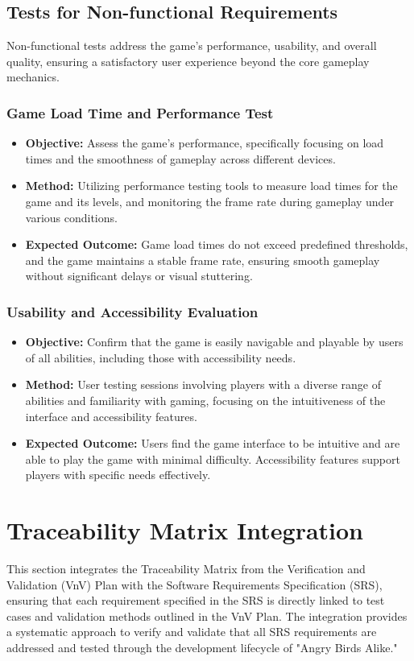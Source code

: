 \documentclass[12pt]{article}
\begin{document}
\subsection{Tests for Non-functional Requirements}

Non-functional tests address the game's performance, usability, and overall quality, ensuring a satisfactory user experience beyond the core gameplay mechanics.

\subsubsection{Game Load Time and Performance Test}
\begin{itemize}
    \item \textbf{Objective:} Assess the game's performance, specifically focusing on load times and the smoothness of gameplay across different devices.
    \item \textbf{Method:} Utilizing performance testing tools to measure load times for the game and its levels, and monitoring the frame rate during gameplay under various conditions.
    \item \textbf{Expected Outcome:} Game load times do not exceed predefined thresholds, and the game maintains a stable frame rate, ensuring smooth gameplay without significant delays or visual stuttering.
\end{itemize}

\subsubsection{Usability and Accessibility Evaluation}
\begin{itemize}
    \item \textbf{Objective:} Confirm that the game is easily navigable and playable by users of all abilities, including those with accessibility needs.
    \item \textbf{Method:} User testing sessions involving players with a diverse range of abilities and familiarity with gaming, focusing on the intuitiveness of the interface and accessibility features.
    \item \textbf{Expected Outcome:} Users find the game interface to be intuitive and are able to play the game with minimal difficulty. Accessibility features support players with specific needs effectively.
\end{itemize}

\section{Traceability Matrix Integration}
This section integrates the Traceability Matrix from the Verification and Validation (VnV) Plan with the Software Requirements Specification (SRS), ensuring that each requirement specified in the SRS is directly linked to test cases and validation methods outlined in the VnV Plan. The integration provides a systematic approach to verify and validate that all SRS requirements are addressed and tested through the development lifecycle of "Angry Birds Alike."
\end{document}
